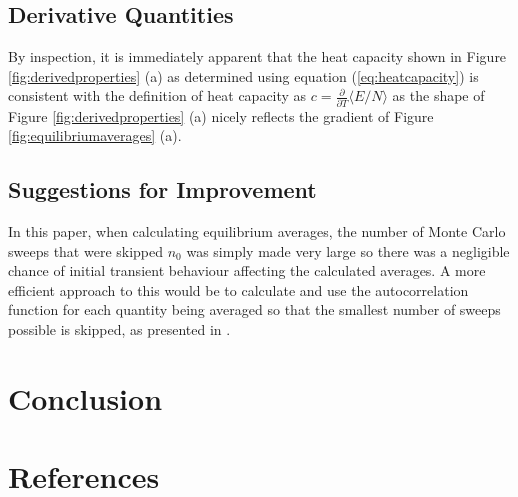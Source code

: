 \documentclass[11pt]{iopart}
\begin{document}
\subsection{Derivative Quantities}
By inspection, it is immediately apparent that the heat capacity shown in Figure \ref{fig:derivedproperties} (a) as determined using equation (\ref{eq:heatcapacity}) is consistent with the definition of heat capacity as $c = \frac{\partial}{\partial T}\langle E/N \rangle$ \cite{handout} as the shape of Figure \ref{fig:derivedproperties} (a) nicely reflects the gradient of Figure \ref{fig:equilibriumaverages} (a).
 
 \subsection{Suggestions for Improvement}
 In this paper, when calculating equilibrium averages, the number of Monte Carlo sweeps that were skipped $n_0$ was simply made very large so there was a negligible chance of initial transient behaviour affecting the calculated averages. A more efficient approach to this would be to calculate and use the autocorrelation function for each quantity being averaged so that the smallest number of sweeps possible is skipped, as presented in \cite{autocorrelation}.
 
\section{Conclusion}

\section*{References}


\end{document}
